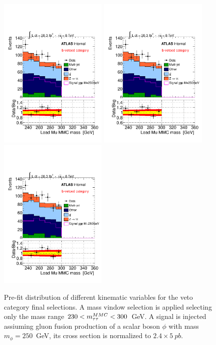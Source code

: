 \begin{figure}[!hb]
  \centering
  \includegraphics[page=3,width=0.47\textwidth]{figure/limits/vetoM230_300.pdf}
  \includegraphics[page=4,width=0.47\textwidth]{figure/limits/vetoM230_300.pdf}
  \includegraphics[page=5,width=0.47\textwidth]{figure/limits/vetoM230_300.pdf}
  \caption{Pre-fit distribution of different kinematic variables for the veto category final selections. A mass vindow selection is applied 
	selecting only the mass range $230 < m_{\tau\tau}^{MMC} < 300 $~GeV. 
	A signal is injected assiuming gluon fusion production of a scalar boson $\phi$ with mass $m_{\phi} = 250$~GeV, its cross section
	is normalized to $2.4\times5~pb$.}

\end{figure}
\clearpage
